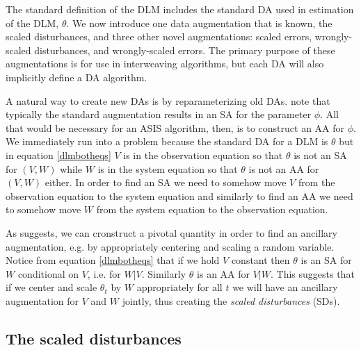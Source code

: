 \documentclass[12pt]{article}
\begin{document}
The standard definition of the DLM includes the standard DA used in estimation of the DLM, $\theta$. We now introduce one data augmentation that is known, the scaled disturbances, and three other novel augmentations: scaled errors, wrongly-scaled disturbances, and wrongly-scaled errors. The primary purpose of these augmentations is for use in interweaving algorithms, but each DA will also implicitly define a DA algorithm.

A natural way to create new DAs is by reparameterizing old DAs. \citet{papaspiliopoulos2007general} note that typically the standard augmentation results in an SA for the parameter $\phi$. All that would be necessary for an ASIS algorithm, then, is to construct an AA for $\phi$. We immediately run into a problem because the standard DA for a DLM is $\theta$ but in equation \eqref{dlmbotheqs} $V$ is in the observation equation so that $\theta$ is not an SA for $(V,W)$ while $W$ is in the system equation so that $\theta$ is not an AA for $(V,W)$ either. In order to find an SA we need to somehow move $V$ from the observation equation to the system equation and similarly to find an AA we need to somehow move $W$ from the system equation to the observation equation.

As \citet{papaspiliopoulos2007general} suggests, we can cronstruct a pivotal quantity in order to find an ancillary augmentation, e.g. by appropriately centering and scaling a random variable. Notice from equation \eqref{dlmbotheqs} that if we hold $V$ constant then $\theta$ is an SA for $W$ conditional on $V$, i.e. for $W|V$. Similarly $\theta$ is an AA for $V|W$. This suggests that if we center and scale $\theta_{t}$ by $W$ appropriately for all $t$ we will have an ancillary augmentation for $V$ and $W$ jointly, thus creating the {\it scaled disturbances} (SDs).

\subsection{The scaled disturbances}\label{sec:DAs:dist}
\end{document}

